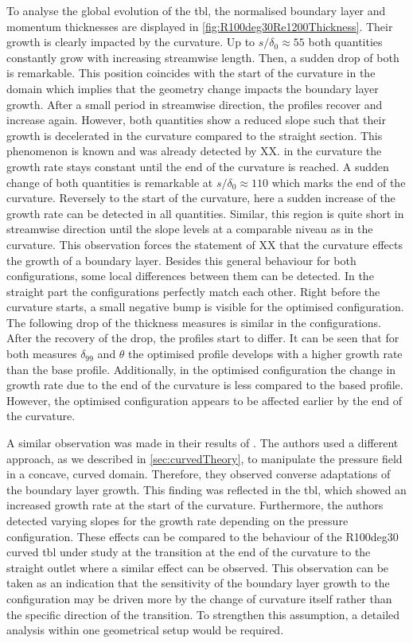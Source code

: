To analyse the global evolution of the \acrshort{tbl}, the normalised boundary layer and momentum thicknesses are displayed in \autoref{fig:R100deg30Re1200Thickness}.
Their growth is clearly impacted by the curvature.
Up to $s/\delta_0 \approx 55$ both quantities constantly grow with increasing streamwise length.
Then, a sudden drop of both is remarkable. 
This position coincides with the start of the curvature in the domain which implies that the geometry change impacts the boundary layer growth.
After a small period in streamwise direction, the profiles recover and increase again. 
However, both quantities show a reduced slope such that their growth is decelerated in the curvature compared to the straight section.
This phenomenon is known and was already detected by XX.
in the curvature the growth rate stays constant until the end of the curvature is reached.
A sudden change of both quantities is remarkable at $s/\delta_0 \approx 110$ which marks the end of the curvature.
Reversely to the start of the curvature, here a sudden increase of the growth rate can be detected in all quantities.
Similar, this region is quite short in streamwise direction until the slope levels at a comparable niveau as in the curvature.
This observation forces the statement of XX that the curvature effects the growth of a boundary layer.
Besides this general behaviour for both configurations, some local differences between them can be detected.
In the straight part the configurations perfectly match each other. 
Right before the curvature starts, a small negative bump is visible for the optimised configuration.
The following drop of the thickness measures is similar in the configurations.
After the recovery of the drop, the profiles start to differ.
It can be seen that for both measures $\delta_{99}$ and $\theta$ the optimised profile develops with a higher growth rate than the base profile.
Additionally, in the optimised configuration the change in growth rate due to the end of the curvature is less compared to the based profile.
However, the optimised configuration appears to be affected earlier by the end of the curvature.

A similar observation was made in their results of \citet{appelbaum_systematic_2025}.
The authors used a different approach, as we described in \autoref{sec:curvedTheory}, to manipulate the pressure field in a concave, curved domain.
Therefore, they observed converse adaptations of the boundary layer growth. 
This finding was reflected in the \acrshort{tbl}, which showed an increased growth rate at the start of the curvature. 
Furthermore, the authors detected varying slopes for the growth rate depending on the pressure configuration.
These effects can be compared to the behaviour of the R100deg30 curved \acrshort{tbl} under study at the transition at the end of the curvature to the straight outlet where a similar effect can be observed.
This observation can be taken as an indication that the sensitivity of the boundary layer growth to the configuration may be driven more by the change of curvature itself rather than the specific direction of the transition. 
To strengthen this assumption, a detailed analysis within one geometrical setup would be required.

